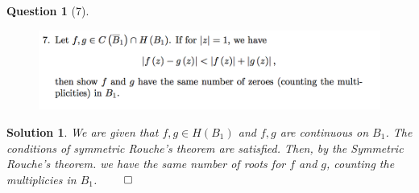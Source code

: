 \documentclass{article} %
\theoremstyle{quest}
\newtheorem*{question}{Question}
\newtheorem*{solution}{Solution}
\begin{document}
\bigskip

\begin{question}[7]
\hfill
\begin{figure}[h!]
\centering
\includegraphics[width=1\textwidth]{cv-9-7}
\end{figure}
\end{question}
\begin{solution}
We are given that $f,g \in H(B_1)$ and $f,g$ are continuous on $B_1$. 
The conditions of symmetric Rouche's theorem are satisfied.
Then, by the Symmetric Rouche's theorem. we have the same number of
roots for $f$ and $g$, counting the multiplicies in $B_1$. 
\hfill $\qed$
\end{solution}
\end{document}
